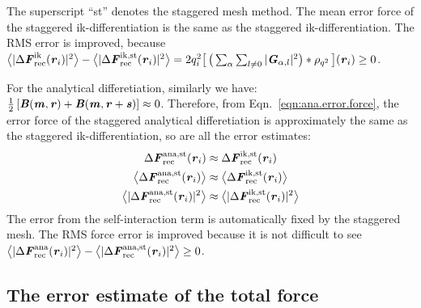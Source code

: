 \documentclass[aps,pre,preprint]{revtex4}
\renewcommand{\v}[1]{\textbf{\textit{#1}}}
\begin{document}
The superscript ``st'' denotes the staggered mesh method.
The mean error force of the staggered ik-differentiation is the
same as the staggered ik-differentiation. The RMS error is improved, because
$\big\langle\vert\Delta\v F_{\textrm{rec}}^{\textrm{ik}}(\v r_i)\vert^2\big\rangle -
\big\langle\vert\Delta\v F_{\textrm{rec}}^{\textrm{ik,st}}(\v r_i)\vert^2\big\rangle=
2q_i^2
\big[\,
\big(
\sum_{\alpha} \sum_{l\neq 0}
\vert \v G_{\alpha,l}\vert^2
\big)
\ast \rho_{q^2}
\,\big] (\v r_i) \geq 0$.

For the analytical differetiation, similarly we have: $\frac12\,[\v
B(\v m,\v r) + \v B(\v m, \v r+\v s)] \approx 0$. Therefore, from
Eqn.~\eqref{eqn:ana.error.force}, the error force of the staggered
analytical differetiation is approximately the same as the staggered
ik-differentiation, so are all the error estimates:
\begin{align}
  \Delta\v F^{\textrm{ana,st}}_{\textrm{rec}}(\v r_i)
  &\approx
  \Delta\v F^{\textrm{ik,st}}_{\textrm{rec}}(\v r_i)\\
  \big\langle
  \Delta\v F_{\textrm{rec}}^{\textrm{ana,st}}(\v r_i)
  \big\rangle
  &\approx
  \big\langle
  \Delta\v F_{\textrm{rec}}^{\textrm{ik,st}}(\v r_i)
  \big\rangle\\
  \big\langle
  \vert\Delta\v F_{\textrm{rec}}^{\textrm{ana,st}}(\v r_i)\vert^2
  \big\rangle
  &\approx
  \big\langle
  \vert\Delta\v F_{\textrm{rec}}^{\textrm{ik,st}}(\v r_i)\vert^2
  \big\rangle
\end{align}
The error from the self-interaction term is automatically fixed by the
staggered mesh. The RMS force error is improved because it is not
difficult to see 
$\big\langle\vert\Delta\v F_{\textrm{rec}}^{\textrm{ana}}(\v r_i)\vert^2\big\rangle -
\big\langle\vert\Delta\v F_{\textrm{rec}}^{\textrm{ana,st}}(\v r_i)\vert^2\big\rangle
\geq 0$.


\subsection{The error estimate of the total force}
\end{document}
